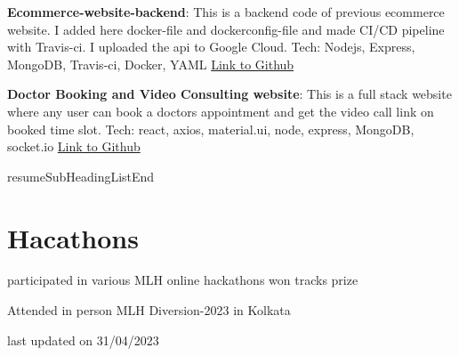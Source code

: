 \documentclass[a4paper,50pt]{article}
\newcommand{\resumeItem}[2]{
  \item\small{
    \textbf{#1}{: #2 \vspace{-2pt}}
  }
}
\newcommand{\resumeSubItem}[2]{\resumeItem{#1}{#2}\vspace{-3pt}}
\begin{document}
\vspace{5pt}
\resumeSubItem{\large Ecommerce-website-backend}{\large This is a backend code of previous ecommerce website. I added here docker-file and dockerconfig-file and made CI/CD pipeline with Travis-ci. I uploaded the api to Google Cloud. Tech: Nodejs, Express, MongoDB, Travis-ci, Docker, YAML}\href{https://github.com/Jayabrata18/ecommerce-website-backend}{\normalsize Link to Github \faExternalLink}
\vspace{5pt}
\resumeSubItem{\large Doctor Booking and Video Consulting website}{\large This is a full stack website where any user can book a doctors appointment and get the video call link on booked time slot. Tech: react, axios, material.ui, node, express, MongoDB, socket.io}\href{https://github.com/Jayabrata18/mlh_diversion2k23_hackathon}{\normalsize Link to Github \faExternalLink}

resumeSubHeadingListEnd
\vspace{-5pt}

\section{Hacathons}
\begin{description}[font=$\bullet$]
\item {\normalsize participated in various MLH online hackathons won tracks prize}
\vspace{-5pt}
\item {\normalsize Attended in person MLH Diversion-2023 in Kolkata}
\vspace{-5pt}

\end{description}
\vspace{-5pt}
{}{last updated on 31/04/2023}
\end{document}
